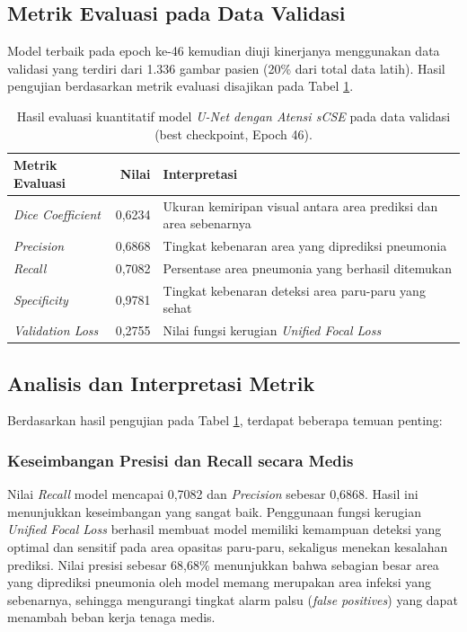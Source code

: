 \documentclass[12pt,a4paper,oneside]{book}
\begin{document}
\subsection{Metrik Evaluasi pada Data Validasi}

Model terbaik pada epoch ke-46 kemudian diuji kinerjanya menggunakan data validasi yang terdiri dari 1.336 gambar pasien (20\% dari total data latih). Hasil pengujian berdasarkan metrik evaluasi disajikan pada Tabel \ref{tab:eval_results}.

\begin{table}[htbp]
  \centering
  \caption{Hasil evaluasi kuantitatif model \textit{U-Net dengan Atensi sCSE} pada data validasi (best checkpoint, Epoch 46).}
  \label{tab:eval_results}
  \begin{tabularx}{\textwidth}{lrX}
    \toprule
    \textbf{Metrik Evaluasi} & \textbf{Nilai} & \textbf{Interpretasi} \\
    \midrule
    \textit{Dice Coefficient}  & 0,6234 & Ukuran kemiripan visual antara area prediksi dan area sebenarnya \\
    \textit{Precision}           & 0,6868 & Tingkat kebenaran area yang diprediksi pneumonia \\
    \textit{Recall}              & 0,7082 & Persentase area pneumonia yang berhasil ditemukan \\
    \textit{Specificity}         & 0,9781 & Tingkat kebenaran deteksi area paru-paru yang sehat \\
    \midrule
    \textit{Validation Loss}     & 0,2755 & Nilai fungsi kerugian \textit{Unified Focal Loss} \\
    \bottomrule
  \end{tabularx}
\end{table}

\subsection{Analisis dan Interpretasi Metrik}

Berdasarkan hasil pengujian pada Tabel \ref{tab:eval_results}, terdapat beberapa temuan penting:

\subsubsection{Keseimbangan Presisi dan Recall secara Medis}

Nilai \textit{Recall} model mencapai 0,7082 dan \textit{Precision} sebesar 0,6868. Hasil ini menunjukkan keseimbangan yang sangat baik. Penggunaan fungsi kerugian \textit{Unified Focal Loss} berhasil membuat model memiliki kemampuan deteksi yang optimal dan sensitif pada area opasitas paru-paru, sekaligus menekan kesalahan prediksi. Nilai presisi sebesar 68,68\% menunjukkan bahwa sebagian besar area yang diprediksi pneumonia oleh model memang merupakan area infeksi yang sebenarnya, sehingga mengurangi tingkat alarm palsu (\textit{false positives}) yang dapat menambah beban kerja tenaga medis.
\end{document}

